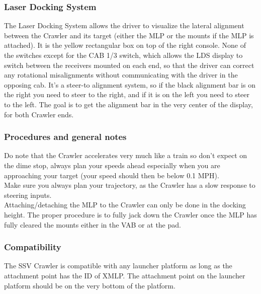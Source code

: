 \documentclass[Space_Shuttle_Vessel_Manual.tex]{subfiles}
\begin{document}
\begin{multicols*}{2}
\subsubsection{Laser Docking System}
The Laser Docking System allows the driver to visualize the lateral alignment between the Crawler and its target (either the MLP or the mounts if the MLP is attached). It is the yellow rectangular box on top of the right console. None of the switches except for the CAB 1/3 switch, which allows the LDS display to switch between the receivers mounted on each end, so that the driver can correct any rotational misalignments without communicating with the driver in the opposing cab. It's a steer-to alignment system, so if the black alignment bar is on the right you need to steer to the right, and if it is on the left you need to steer to the left. The goal is to get the alignment bar in the very center of the display, for both Crawler ends.
\\

\subsubsection{Procedures and general notes}
Do note that the Crawler accelerates very much like a train so don't expect on the dime stop, always plan your speeds ahead especially when you are approaching your target (your speed should then be below 0.1 MPH).\\
Make sure you always plan your trajectory, as the Crawler has a slow response to steering inputs.\\
Attaching/detaching the MLP to the Crawler can only be done in the docking height. The proper procedure is to fully jack down the Crawler once the MLP has fully cleared the mounts either in the VAB or at the pad.
\\

\subsubsection{Compatibility}
The SSV Crawler is compatible with any launcher platform as long as the attachment point has the ID of XMLP. The attachment point on the launcher platform should be on the very bottom of the platform.
\\

\end{multicols*}
\end{document}
